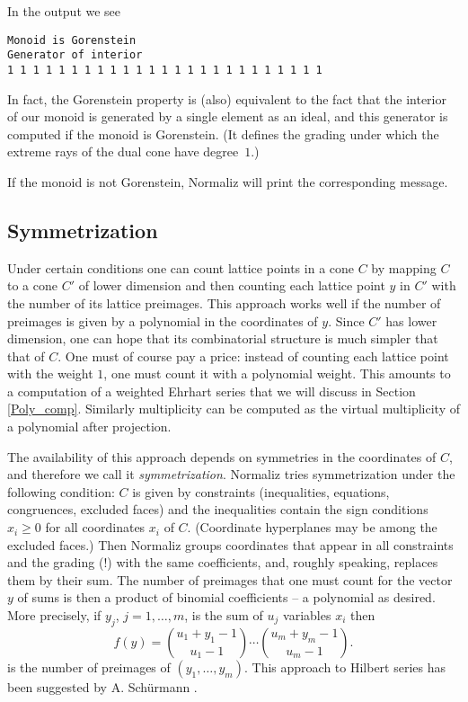 \documentclass[12pt,a4paper]{scrartcl}
\theoremstyle{definition}
\begin{document}
{In the output we see
\begin{Verbatim}
Monoid is Gorenstein 
Generator of interior
1 1 1 1 1 1 1 1 1 1 1 1 1 1 1 1 1 1 1 1 1 1 1 1 1 
\end{Verbatim}

In fact, the Gorenstein property is (also) equivalent to the fact that the interior of our monoid is generated by a single element as an ideal, and this generator is computed if the monoid is Gorenstein. (It defines the grading under which the extreme rays of the dual cone have degree~$1$.)

If the monoid is not Gorenstein, Normaliz will print the corresponding message.

\subsection{Symmetrization}\label{symmetrize}

Under certain conditions one can count lattice points in a cone $C$  by mapping $C$ to a cone $C'$ of lower dimension and then counting each lattice point $y$ in $C'$ with the number of its lattice preimages. This approach works well if the number of preimages is given by a polynomial in the coordinates of $y$. Since $C'$ has lower dimension, one can hope that its combinatorial structure is much simpler that that of $C$. One must of course pay a price: instead of counting each lattice point with the weight $1$, one must count it with a polynomial weight. This amounts to a computation of a weighted Ehrhart series that we will discuss in Section \ref{Poly_comp}. Similarly multiplicity can be computed as the virtual multiplicity of a polynomial after projection.

The availability of this approach depends on symmetries in the coordinates of $C$, and therefore we call it \emph{symmetrization}. Normaliz tries symmetrization under the following condition: $C$ is given by constraints (inequalities, equations, congruences, excluded faces) and the inequalities contain the sign conditions $x_i\ge 0$ for all coordinates  $x_i$ of $C$. (Coordinate hyperplanes may be among the excluded faces.) Then Normaliz groups coordinates that appear in all constraints and the grading (!) with the same coefficients, and, roughly speaking, replaces them by their sum. The number of preimages that one must count for the vector $y$  of sums is then a product of binomial coefficients -- a polynomial as desired. More precisely, if $y_j$, $j=1,\dots,m$, is the sum of  $u_j$ variables $x_i$ then
$$
f(y)=\binom{u_1+y_1-1}{u_1-1}\cdots \binom{u_m+y_m-1}{u_m-1}.
$$
is the number of preimages of $(y_1,\dots,y_m)$. This approach to Hilbert series has been suggested by A. Sch\"urmann \cite{Sch}.

}
\end{document}
